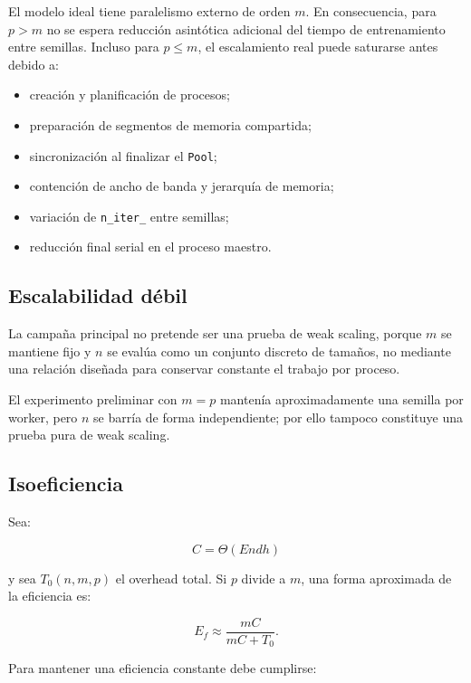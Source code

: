 \documentclass[11pt,a4paper]{article}
\newcommand{\Cost}{C}
\begin{document}
El modelo ideal tiene paralelismo externo de orden $m$. En consecuencia, para $p>m$
no se espera reducción asintótica adicional del tiempo de entrenamiento entre semillas.
Incluso para $p\le m$, el escalamiento real puede saturarse antes debido a:

\begin{itemize}[leftmargin=*]
    \item creación y planificación de procesos;
    \item preparación de segmentos de memoria compartida;
    \item sincronización al finalizar el \texttt{Pool};
    \item contención de ancho de banda y jerarquía de memoria;
    \item variación de \texttt{n\_iter\_} entre semillas;
    \item reducción final serial en el proceso maestro.
\end{itemize}

\subsection{Escalabilidad débil}

La campaña principal no pretende ser una prueba de weak scaling, porque $m$ se mantiene
fijo y $n$ se evalúa como un conjunto discreto de tamaños, no mediante una relación
diseñada para conservar constante el trabajo por proceso.

El experimento preliminar con $m=p$ mantenía aproximadamente una semilla por worker,
pero $n$ se barría de forma independiente; por ello tampoco constituye una prueba pura
de weak scaling.

\subsection{Isoeficiencia}

Sea:

\begin{equation}
    \Cost=\Theta(E n d h)
\end{equation}

y sea $T_0(n,m,p)$ el overhead total. Si $p$ divide a $m$, una forma aproximada de la
eficiencia es:

\begin{equation}
    E_f
    \approx
    \frac{m\Cost}
         {m\Cost+T_0}.
\end{equation}

Para mantener una eficiencia constante debe cumplirse:
\end{document}
